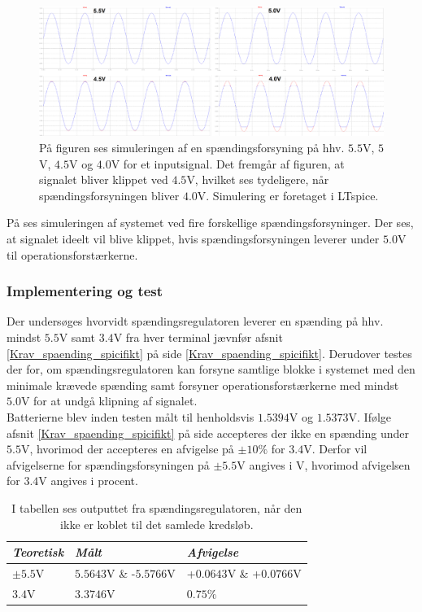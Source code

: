 \begin{figure}[H]
	\centering
	\includegraphics[scale=0.2]{figures/cProblemloesning/Spaendingsforsyning2.PNG}
	\caption{På figuren ses simuleringen af en spændingsforsyning på hhv. $5.5$V, $5$V, $4.5$V og $4.0$V for et inputsignal. Det fremgår af figuren, at signalet bliver klippet ved $4.5$V, hvilket ses tydeligere, når spændingsforsyningen bliver $4.0$V. Simulering er foretaget i LTspice.}
	\label{fig:spaendingsforsyning_graf}
\end{figure}
På  ses simuleringen af systemet ved fire forskellige spændingsforsyninger. Der ses, at signalet ideelt vil blive klippet, hvis spændingsforsyningen leverer under $5.0$V til operationsforstærkerne.

\subsubsection{Implementering og test}
Der undersøges hvorvidt spændingsregulatoren leverer en spænding på hhv. mindst $5.5$V samt $3.4$V fra hver terminal jævnfør afsnit \ref{Krav_spaending_spicifikt} på side \ref{Krav_spaending_spicifikt}. Derudover testes der for, om spændingsregulatoren kan forsyne samtlige blokke i systemet med den minimale krævede spænding samt forsyner operationsforstærkerne med mindst $5.0$V for at undgå klipning af signalet. \\
Batterierne blev inden testen målt til henholdsvis $1.5394$V og $1.5373$V. Ifølge afsnit \ref{Krav_spaending_spicifikt} på side \pageref{Krav_spaending_spicifikt} accepteres der ikke en spænding under $5.5$V, hvorimod der accepteres en afvigelse på $\pm10\%$ for $3.4$V. Derfor vil afvigelserne for spændingsforsyningen på $\pm5.5$V angives i V, hvorimod afvigelsen for $3.4$V angives i procent.
\begin{table}[H]
	\centering
	\begin{tabular}{|l|l|l|}
		\hline
		\textit{Teoretisk} & \textit{Målt} & \textit{Afvigelse} \\ \hline
		$\pm5.5$V          &     $5.5643$V \& -$5.5766$V   &     +$0.0643$V \& +$0.0766$V                 \\ \hline
		$3.4$V             &     $3.3746$V                 &      $0.75\%$                                \\ \hline
	\end{tabular}
	\caption{I tabellen ses outputtet fra spændingsregulatoren, når den ikke er koblet til det samlede kredsløb.}
	\label{tab:spaending_resultat}
\end{table}
 
